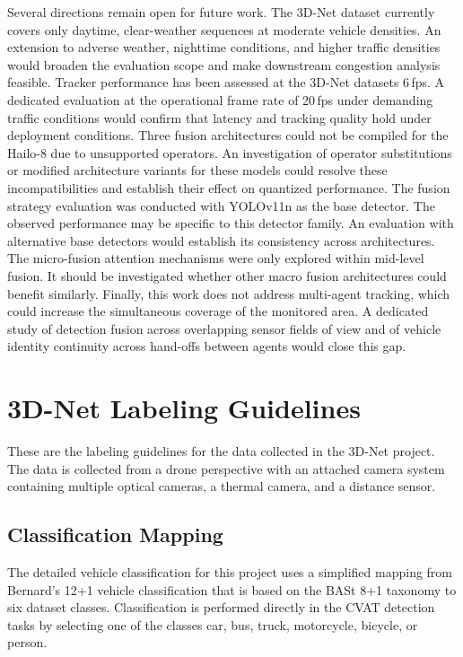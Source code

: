 \documentclass[12pt,oneside,bibtotoc,liststotoc]{scrbook}
\begin{document}
Several directions remain open for future work. The 3D-Net dataset currently covers
only daytime, clear-weather sequences at moderate vehicle densities. An extension to adverse
weather, nighttime conditions, and higher traffic densities would broaden the evaluation
scope and make downstream congestion analysis feasible. Tracker performance has been assessed
at the 3D-Net datasets 6\,fps. A dedicated evaluation at the operational frame rate of 20\,fps under demanding
traffic conditions would confirm that latency and tracking quality hold under deployment
conditions. Three fusion architectures could not be compiled for the Hailo-8 due to
unsupported operators. An investigation of operator substitutions or modified architecture
variants for these models could resolve these incompatibilities and establish their effect
on quantized performance. The fusion strategy evaluation was conducted with YOLOv11n as the
base detector. The observed performance may be specific to this detector
family. An evaluation with alternative base detectors would establish its consistency across
architectures. The micro-fusion attention mechanisms were only explored within mid-level
fusion. It should be investigated whether other macro fusion architectures could benefit similarly.
Finally, this work does not address multi-agent tracking, which could
increase the simultaneous coverage of the monitored area. A dedicated study of
detection fusion across overlapping sensor fields of view and of vehicle identity continuity
across hand-offs between agents would close this gap.

\newpage
\appendix

\chapter{3D-Net Labeling Guidelines}
\label{app:labeling_guidelines}

These are the labeling guidelines for the data collected in the 3D-Net
project. The data is collected from a drone perspective with an attached
camera system containing multiple optical cameras, a thermal camera, and
a distance sensor.

\vspace{-2em}
\section{Classification Mapping}
\vspace{-0.5em}

The detailed vehicle classification for this project uses a simplified mapping
from Bernard's 12+1 vehicle classification that is based on the BASt 8+1
taxonomy to six dataset classes.
Classification is performed directly in the CVAT detection tasks by selecting
one of the classes
car, bus, truck, motorcycle, bicycle, or person.
\end{document}
